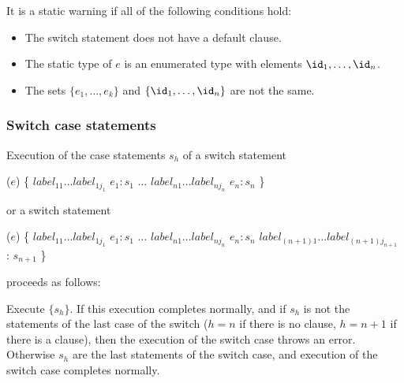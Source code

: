 \documentclass[makeidx]{article}
\begin{document}
{

\LMHash{}%
It is a static warning if all of the following conditions hold:
\begin{itemize}
\item The switch statement does not have a default clause.
\item The static type of $e$ is an enumerated type with elements $\id_1, \ldots, \id_n$.
\item The sets $\{e_1, \ldots, e_k\} $ and $\{\id_1, \ldots, \id_n\}$ are not the same.
\end{itemize}



\subsubsection{Switch case statements}

\LMHash{}%
Execution of the case statements $s_h$ of a switch statement

\begin{normativeDartCode}
\SWITCH{} ($e$) \{
   $label_{11} \ldots label_{1j_1}$ \CASE{} $e_1: s_1$
   $\ldots$
   $label_{n1} \ldots label_{nj_n}$ \CASE{} $e_n: s_n$
\}
\end{normativeDartCode}

or a switch statement

\begin{normativeDartCode}
\SWITCH{} ($e$) \{
   $label_{11} \ldots label_{1j_1}$ \CASE{} $e_1: s_1$
   $\ldots$
   $label_{n1} \ldots label_{nj_n}$ \CASE{} $e_n: s_n$
   $label_{(n+1)1} \ldots label_{(n+1)j_{n+1}}$ \DEFAULT{}: $s_{n+1}$
\}
\end{normativeDartCode}

proceeds as follows:

\LMHash{}%
Execute $\{s_h\}$.
If this execution completes normally,
and if $s_h$ is not the statements of the last case of the switch
($h = n$ if there is no \DEFAULT{} clause,
$h = n+1$ if there is a \DEFAULT{} clause),
then the execution of the switch case throws an error.
Otherwise $s_h$ are the last statements of the switch case,
and execution of the switch case completes normally.


}
\end{document}
